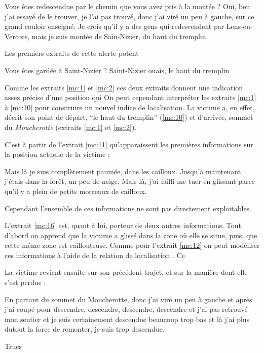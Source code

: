 \begin{dialogue*}
  \Sec {} Vous êtes redescendue par le chemin que
  vous avez pris à la montée ?
  \Req {} Oui, ben j’ai essayé de le trouver, je l’ai pas
  trouvé,  donc j’ai viré un peu à gauche,
   sur ce grand couloir enseigné.  Je
  crois qu’il y a des gens qui redescendent par Lens-en-Vercors,
   mais je suis montée de Sain-Nizier, du haut du
  tremplin.
\end{dialogue*}
% 
Les premiers extraits de cette alerte potent

\begin{dialogue*}
  \Sec {} Vous êtes gardée à Saint-Nizier ?
  \Req {} Saint-Nizier ouais, le haut du tremplin
\end{dialogue*}
% 
Comme les extraits \ref{mc:1} et \ref{mc:2} ces deux extraits donnent
une indication assez précise d'une position qui
%
On peut cependant interpréter les extraits \ref{mc:1} à \ref{mc:10}
pour construire un nouvel indice de localisation. La victime a, en
effet, décrit son point de départ, \enquote{le haut du tremplin}
(\ref{mc:10}) et d'arrivée, sommet du \emph{Moucherotte} (extraits
\ref{mc:1} et \ref{mc:2}).


C'est à partir de l'extrait \ref{mc:11} qu'apparaissent les premières
informations sur la position actuelle de la victime :
%
\begin{dialogue*}
  \Req {} Mais là je suis complètement paumée,
   dans les cailloux.  Jusqu’à
  maintenant j’étais dans la forêt,  un peu de
  neige.  Mais là, j’ai failli me tuer en glissant
   parce qu’il y a plein de petits morceaux de
  cailloux.
\end{dialogue*}
% 
Cependant l'ensemble de ces informations ne sont pas directement
exploitables.

L'extrait \ref{mc:16} est, quant à lui, porteur de deux autres
informations. Tout d'abord on apprend que la victime a glissé dans la
zone où elle se situe, puis, que cette même zone est
caillouteuse.
%
Comme pour l'extrait \ref{mc:12} on peut modéliser ces
informations à l'aide de la relation de localisation
. Ce 


La victime revient ensuite sur son précédent trajet, et sur la manière
dont elle s'est perdue :
%
\begin{dialogue*}
  \Req {} En partant du sommet du Moucherotte, donc j’ai
  viré un peu à gauche et  après j'ai coupé pour
   descendre, descendre, descendre, descendre et
   j’ai pas retrouvé mon sentier et 
  je suis certainement descendue beaucoup trop bas et là
   j’ai plus dutout la force de remonter, je suis trop
  descendue.
\end{dialogue*}
% 
Trucs

